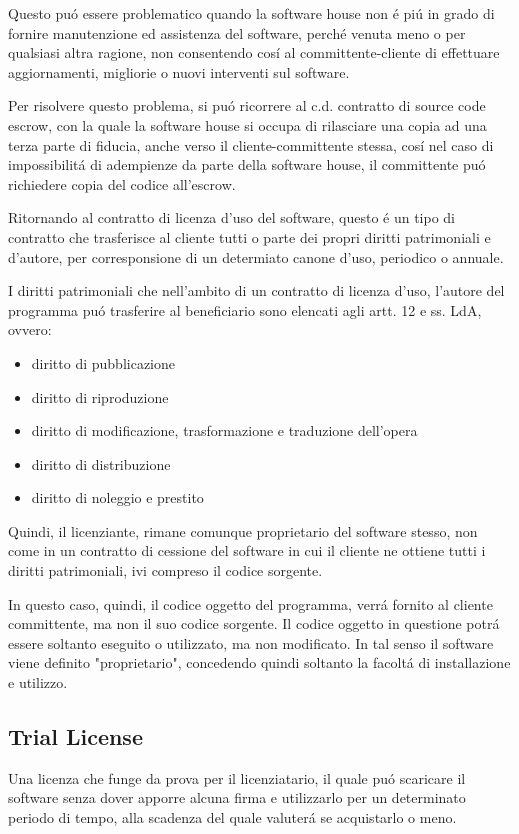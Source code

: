 \documentclass{article}
\begin{document}
Questo pu\'o essere problematico quando la software house non \'e pi\'u in grado di fornire manutenzione ed assistenza del software, perch\'e venuta meno o per qualsiasi altra ragione, non consentendo cos\'i al committente-cliente di effettuare aggiornamenti, migliorie o nuovi interventi sul software. 

Per risolvere questo problema, si pu\'o ricorrere al c.d. contratto di source code escrow, con la quale la software house si occupa di rilasciare una copia ad una terza parte di fiducia, anche verso il cliente-committente stessa, cos\'i nel caso di impossibilit\'a di adempienze da parte della software house, il committente pu\'o richiedere copia del codice all'escrow.

Ritornando al contratto di licenza d'uso del software, questo \'e un tipo di contratto che trasferisce al cliente tutti o parte dei propri diritti patrimoniali e d'autore, per corresponsione di un determiato canone d'uso, periodico o annuale.

I diritti patrimoniali che nell'ambito di un contratto di licenza d'uso, l'autore del programma pu\'o trasferire al beneficiario sono elencati agli artt. 12 e ss. LdA, ovvero:

\begin{itemize}
    \item diritto di pubblicazione
    \item diritto di riproduzione
    \item diritto di modificazione, trasformazione e traduzione dell'opera
    \item diritto di distribuzione
    \item diritto di noleggio e prestito
\end{itemize}

Quindi, il licenziante, rimane comunque proprietario del software stesso, non come in un contratto di cessione del software in cui il cliente ne ottiene tutti i diritti patrimoniali, ivi compreso il codice sorgente. 

In questo caso, quindi, il codice oggetto del programma, verr\'a fornito al cliente committente, ma non il suo codice sorgente. Il codice oggetto in questione potr\'a essere soltanto eseguito o utilizzato, ma non modificato. In tal senso il software viene definito "proprietario", concedendo quindi soltanto la facolt\'a di installazione e utilizzo.

\subsection{Trial License}
Una licenza che funge da prova per il licenziatario, il quale pu\'o scaricare il software senza dover apporre alcuna firma e utilizzarlo per un determinato periodo di tempo, alla scadenza del quale valuter\'a se acquistarlo o meno.
\end{document}
